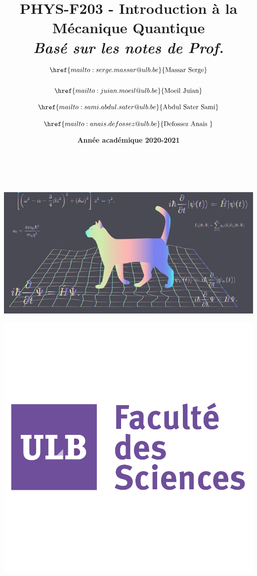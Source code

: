 \documentclass{book}
\title{\textbf{PHYS-F203 - Introduction à la Mécanique Quantique} \\ \textit{Basé sur les notes de Prof. $\href{mailto:serge.massar@ulb.be}{\text{Massar Serge}}$}}
\author{$\href{mailto:juian.moeil@ulb.be}{\text{Moeil Juian}}$ \and $\href{mailto:sami.abdul.sater@ulb.be}{\text{Abdul Sater Sami}}$ \and $\href{mailto:anais.defossez@ulb.be}{\text{Defossez Anais }}$}
\date{\textbf{Année académique 2020-2021}}
\numberwithin{equation}{part}
\begin{document}
\makeatletter
\begin{titlepage}
    \centering
    \huge{\@title} \\
    \vspace{1cm}
    \@date \\
    \vspace{1cm}
    \includegraphics[scale=0.65]{Images/cat.jpg} \\
    \vspace{1cm}
    \begin{minipage}{\linewidth}
        \begin{minipage}{0.45\linewidth}
            \begin{center}
                \includegraphics[scale=0.2]{Images/sciences.png} 

\end{center}
\end{minipage}
\end{minipage}
\end{titlepage}
\end{document}
